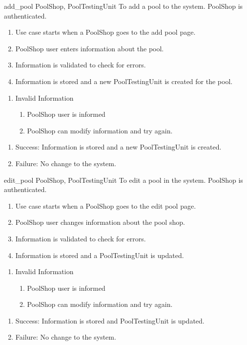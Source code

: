 \usecase
{add\_pool}
{PoolShop, PoolTestingUnit}
{To add a pool to the system.}
{PoolShop is authenticated.}
{
\begin{enumerate}
\item Use case starts when a PoolShop goes to the add pool page.
\item PoolShop user enters information about the pool.
\item Information is validated to check for errors.
\item Information is stored and a new PoolTestingUnit is created for the pool.
\end{enumerate}
}
{
\begin{enumerate}
\item Invalid Information
\begin{enumerate}
\item PoolShop user is informed
\item PoolShop can modify information and try again.
\end{enumerate}
\end{enumerate}
}
{
\begin{enumerate}
\item Success: Information is stored and a new PoolTestingUnit is created.
\item Failure: No change to the system.
\end{enumerate}
}

\usecase
{edit\_pool}
{PoolShop, PoolTestingUnit}
{To edit a pool in the system.}
{PoolShop is authenticated.}
{
\begin{enumerate}
\item Use case starts when a PoolShop goes to the edit pool page.
\item PoolShop user changes information about the pool shop.
\item Information is validated to check for errors.
\item Information is stored and a PoolTestingUnit is updated.
\end{enumerate}
}
{
\begin{enumerate}
\item Invalid Information
\begin{enumerate}
\item PoolShop user is informed
\item PoolShop can modify information and try again.
\end{enumerate}
\end{enumerate}
}
{
\begin{enumerate}
\item Success: Information is stored and PoolTestingUnit is updated.
\item Failure: No change to the system.
\end{enumerate}
}

